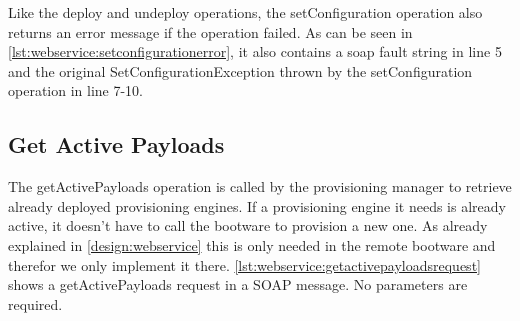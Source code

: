 \vspace*{\baselineskip}

Like the deploy and undeploy operations, the setConfiguration operation also returns an error message if the operation failed.
As can be seen in \autoref{lst:webservice:setconfigurationerror}, it also contains a soap fault string in line 5 and the original SetConfigurationException thrown by the setConfiguration operation in line 7-10.

\vspace*{\baselineskip}

\subsection{Get Active Payloads}

The getActivePayloads operation is called by the provisioning manager to retrieve already deployed provisioning engines.
If a provisioning engine it needs is already active, it doesn't have to call the bootware to provision a new one.
As already explained in \autoref{design:webservice} this is only needed in the remote bootware and therefor we only implement it there.
\autoref{lst:webservice:getactivepayloadsrequest} shows a getActivePayloads request in a SOAP message.
No parameters are required.

\vspace*{\baselineskip}

